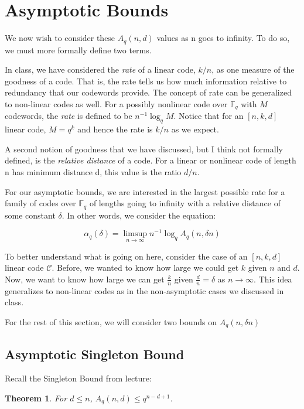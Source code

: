 \documentclass{article}
\theoremstyle{plain}
\newtheorem{theorem}{Theorem}[section]
\theoremstyle{definition}
\begin{document}
\section{Asymptotic Bounds}
We now wish to consider these $A_q(n,d)$ values as n goes to infinity.  To do so, we must more formally define two terms.

In class, we have considered the \textit{rate} of a linear code, $k/n$, as one measure of the goodness of a code.  That is,
the rate tells us how much information relative to redundancy that our codewords provide.  The concept of rate can be generalized
to non-linear codes as well.  For a possibly nonlinear code over $\mathbb{F}_q$ with $M$ codewords, the \textit{rate} is defined to be $n^{-1} \log_q {M}$.  Notice that
for an $[n,k,d]$ linear code, $M = q^k$ and hence the rate is $k/n$ as we expect.

A second notion of goodness that we have discussed, but I think not formally defined, is the \textit{relative distance} of a code.  For a linear or nonlinear code of length n
has minimum distance d, this value is the ratio $d/n$. 

For our asymptotic bounds, we are interested in the largest
possible rate for a family of codes over $\mathbb{F}_q$ of lengths going to
infinity with a relative distance of some constant $\delta$.  In other words, we consider the equation:

\begin{equation}
\alpha_{q}(\delta) = \limsup_{n \to \infty} n^{-1} \log_q A_q(n,\delta n)
\end{equation}

To better understand what is going on here, consider the case of an $[n,k,d]$ linear code $\mathcal{C}$.  Before, we wanted to know how large we could get $k$ given
$n$ and $d$.  Now, we want to know how large we can get $\frac{k}{n}$ given $\frac{d}{n}=\delta$ as $n\to\infty$.  This idea generalizes to non-linear codes as 
in the non-asymptotic cases we discussed in class.

For the rest of this section, we will consider two bounds on $A_q(n,\delta n)$

\subsection{Asymptotic Singleton Bound}

Recall the Singleton Bound from lecture:

\begin{theorem}
For $d \le n$, $A_q(n,d) \le q^{n-d+1}$.
\end{theorem}
\end{document}
